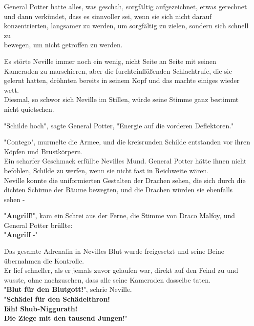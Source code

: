 {General Potter hatte alles, was geschah, sorgfältig aufgezeichnet, etwas gerechnet und dann verkündet, dass es sinnvoller sei, wenn sie sich nicht darauf konzentrierten, langsamer zu werden, um sorgfältig zu zielen, sondern sich schnell zu\\ bewegen, um nicht getroffen zu werden.

Es störte Neville immer noch ein wenig, nicht Seite an Seite mit seinen Kameraden zu marschieren, aber die furchteinflößenden Schlachtrufe, die sie gelernt hatten, dröhnten bereits in seinem Kopf und das machte einiges wieder wett.\\ Diesmal, so schwor sich Neville im Stillen, würde seine Stimme ganz bestimmt nicht quietschen.

"Schilde hoch", sagte General Potter, "Energie auf die vorderen Deflektoren."

"Contego", murmelte die Armee, und die kreisrunden Schilde entstanden vor ihren Köpfen und Brustkörpern.\\ Ein scharfer Geschmack erfüllte Nevilles Mund. General Potter hätte ihnen nicht befohlen, Schilde zu werfen, wenn sie nicht fast in Reichweite wären.\\ Neville konnte die uniformierten Gestalten der Drachen sehen, die sich durch die dichten Schirme der Bäume bewegten, und die Drachen würden sie ebenfalls sehen -

"\textbf{Angriff}!", kam ein Schrei aus der Ferne, die Stimme von Draco Malfoy, und General Potter brüllte:\\ "\textbf{Angriff} -"

Das gesamte Adrenalin in Nevilles Blut wurde freigesetzt und seine Beine übernahmen die Kontrolle.\\ Er lief schneller, als er jemals zuvor gelaufen war, direkt auf den Feind zu und wusste, ohne nachzusehen, dass alle seine Kameraden dasselbe taten.\\ "\textbf{Blut für den Blutgott!}", schrie Neville.\\ "\textbf{Schädel für den Schädelthron!}\\ \textbf{Iäh! Shub-Niggurath!}\\ \textbf{Die Ziege mit den tausend Jungen!}"

}
